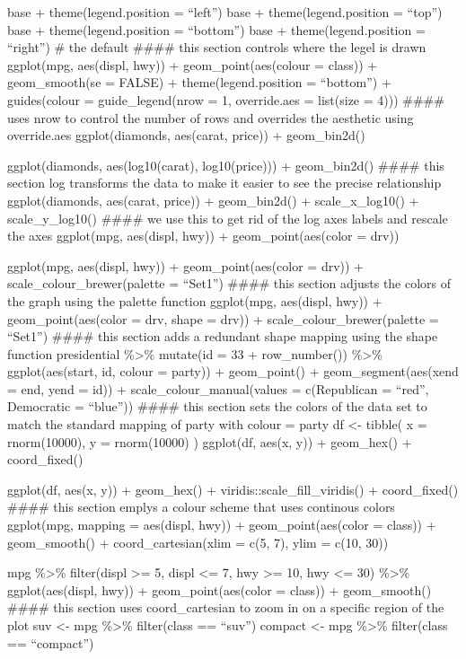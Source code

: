 \documentclass[
]{article}
\begin{document}
base + theme(legend.position = ``left'') base + theme(legend.position =
``top'') base + theme(legend.position = ``bottom'') base +
theme(legend.position = ``right'') \# the default \#\#\#\# this section
controls where the legel is drawn ggplot(mpg, aes(displ, hwy)) +
geom\_point(aes(colour = class)) + geom\_smooth(se = FALSE) +
theme(legend.position = ``bottom'') + guides(colour = guide\_legend(nrow
= 1, override.aes = list(size = 4))) \#\#\#\# uses nrow to control the
number of rows and overrides the aesthetic using override.aes
ggplot(diamonds, aes(carat, price)) + geom\_bin2d()

ggplot(diamonds, aes(log10(carat), log10(price))) + geom\_bin2d()
\#\#\#\# this section log transforms the data to make it easier to see
the precise relationship ggplot(diamonds, aes(carat, price)) +
geom\_bin2d() + scale\_x\_log10() + scale\_y\_log10() \#\#\#\# we use
this to get rid of the log axes labels and rescale the axes ggplot(mpg,
aes(displ, hwy)) + geom\_point(aes(color = drv))

ggplot(mpg, aes(displ, hwy)) + geom\_point(aes(color = drv)) +
scale\_colour\_brewer(palette = ``Set1'') \#\#\#\# this section adjusts
the colors of the graph using the palette function ggplot(mpg,
aes(displ, hwy)) + geom\_point(aes(color = drv, shape = drv)) +
scale\_colour\_brewer(palette = ``Set1'') \#\#\#\# this section adds a
redundant shape mapping using the shape function presidential
\%\textgreater\% mutate(id = 33 + row\_number()) \%\textgreater\%
ggplot(aes(start, id, colour = party)) + geom\_point() +
geom\_segment(aes(xend = end, yend = id)) + scale\_colour\_manual(values
= c(Republican = ``red'', Democratic = ``blue'')) \#\#\#\# this section
sets the colors of the data set to match the standard mapping of party
with colour = party df \textless- tibble( x = rnorm(10000), y =
rnorm(10000) ) ggplot(df, aes(x, y)) + geom\_hex() + coord\_fixed()

ggplot(df, aes(x, y)) + geom\_hex() + viridis::scale\_fill\_viridis() +
coord\_fixed() \#\#\#\# this section emplys a colour scheme that uses
continous colors ggplot(mpg, mapping = aes(displ, hwy)) +
geom\_point(aes(color = class)) + geom\_smooth() + coord\_cartesian(xlim
= c(5, 7), ylim = c(10, 30))

mpg \%\textgreater\% filter(displ \textgreater= 5, displ \textless= 7,
hwy \textgreater= 10, hwy \textless= 30) \%\textgreater\%
ggplot(aes(displ, hwy)) + geom\_point(aes(color = class)) +
geom\_smooth() \#\#\#\# this section uses coord\_cartesian to zoom in on
a specific region of the plot suv \textless- mpg \%\textgreater\%
filter(class == ``suv'') compact \textless- mpg \%\textgreater\%
filter(class == ``compact'')
\end{document}
